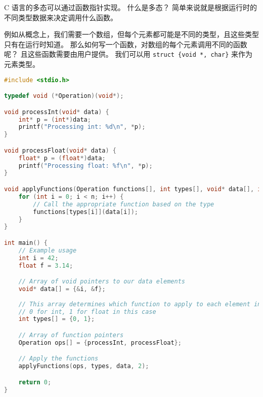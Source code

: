 
C 语言的多态可以通过函数指针实现。 什么是多态？ 简单来说就是根据运行时的不同类型数据来决定调用什么函数。

例如从概念上，我们需要一个数组，但每个元素都可能是不同的类型，且这些类型只有在运行时知道。 那么如何写一个函数，对数组的每个元素调用不同的函数呢？ 且这些函数需要由用户提供。 我们可以用 \verb`struct {void *, char}` 来作为元素类型。

\begin{lstlisting}[language=cpp]
#include <stdio.h>

typedef void (*Operation)(void*);

void processInt(void* data) {
    int* p = (int*)data;
    printf("Processing int: %d\n", *p);
}

void processFloat(void* data) {
    float* p = (float*)data;
    printf("Processing float: %f\n", *p);
}

void applyFunctions(Operation functions[], int types[], void* data[], int n) {
    for (int i = 0; i < n; i++) {
        // Call the appropriate function based on the type
        functions[types[i]](data[i]);
    }
}

int main() {
    // Example usage
    int i = 42;
    float f = 3.14;

    // Array of void pointers to our data elements
    void* data[] = {&i, &f};
    
    // This array determines which function to apply to each element in 'data'
    // 0 for int, 1 for float in this case
    int types[] = {0, 1};

    // Array of function pointers
    Operation ops[] = {processInt, processFloat};

    // Apply the functions
    applyFunctions(ops, types, data, 2);

    return 0;
}
\end{lstlisting}
